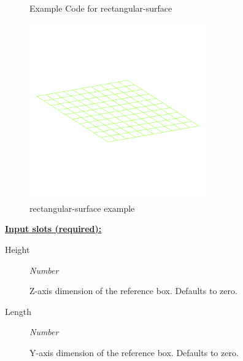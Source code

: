 \documentclass [11pt]{book}
\begin{document}
\begin{itemize}
\begin{figure}
\begin{lrbox}{\boxedverb}
\begin{minipage}{\linewidth}
{\begin{verbatim}
 
\end{verbatim}}
\end{minipage}
\end{lrbox}
\fbox{\usebox{\boxedverb}}

\caption{Example Code for rectangular-surface}

\label{fig:example-code-rectangular-surface}

\end{figure}

\begin{figure}
\begin{center}
\includegraphics[width=3in,height=3in]{../images/example-rectangular-surface.pdf}
\end{center}

\caption{rectangular-surface example}

\label{fig:rectangular-surface}

\end{figure}





\textbf{
\underline{Input slots (required):}}

\begin{description}

\item [Height]
\emph{Number}

 Z-axis dimension of the reference box. Defaults to zero.




\item [Length]
\emph{Number}

 Y-axis dimension of the reference box. Defaults to zero.





\end{description}
\end{itemize}
\end{document}
